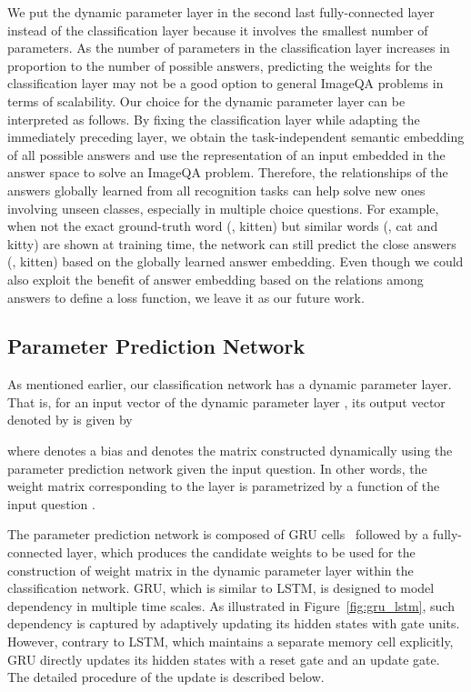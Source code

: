 \documentclass[10pt,twocolumn,letterpaper]{article}
\begin{document}
We put the dynamic parameter layer in the second last fully-connected layer instead of the classification layer because it involves the smallest number of parameters.
As the number of parameters in the classification layer increases in proportion to the number of possible answers, predicting the weights for the classification layer may not be a good option to general ImageQA problems in terms of scalability.
Our choice for the dynamic parameter layer can be interpreted as follows. 
By fixing the classification layer while adapting the immediately preceding layer, we obtain the task-independent semantic embedding of all possible answers and use the representation of an input embedded in the answer space to solve an ImageQA problem.
Therefore, the relationships of the answers globally learned from all recognition tasks can help solve new ones involving unseen classes, especially in multiple choice questions.
For example, when not the exact ground-truth word (\eg, kitten) but similar words (\eg, cat and kitty) are shown at training time, the network can still predict the close answers (\eg, kitten) based on the globally learned answer embedding.
Even though we could also exploit the benefit of answer embedding based on the relations among answers to define a loss function, we leave it as our future work.




\subsection{Parameter Prediction Network}
\label{sub:paramter}



As mentioned earlier, our classification network has a dynamic parameter layer.
That is, for an input vector of the dynamic parameter layer , its output vector denoted by  is given by

where  denotes a bias and  denotes the matrix constructed dynamically using the parameter prediction network given the input question.
In other words, the weight matrix corresponding to the layer is parametrized by a function of the input question .








The parameter prediction network is composed of GRU cells~\cite{chung2014empirical} followed by a fully-connected layer, which produces the candidate weights to be used for the construction of weight matrix in the dynamic parameter layer within the classification network.
GRU, which is similar to LSTM, is designed to model dependency in multiple time scales.
As illustrated in Figure~\ref{fig:gru_lstm}, such dependency is captured by adaptively updating its hidden states with gate units.
However, contrary to LSTM, which maintains a separate memory cell explicitly, GRU directly updates its hidden states with a reset gate and an update gate. 
The detailed procedure of the update is described below.
\end{document}
